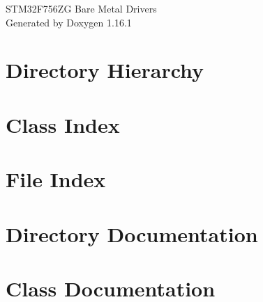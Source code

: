 \documentclass[twoside]{book}
\newcommand{\+}{\discretionary{\mbox{\scriptsize$\hookleftarrow$}}{}{}}
\newcommand{\clearemptydoublepage}{%
    \newpage{\pagestyle{empty}\cleardoublepage}%
  }
\begin{document}
  \raggedbottom
    \hypersetup{pageanchor=false,
                bookmarksnumbered=true,
                pdfencoding=unicode
               }
  \begin{titlepage}
  \vspace*{7cm}
  \begin{center}%
  {\Large STM32\+F756\+ZG Bare Metal Drivers}\\
  \vspace*{1cm}
  {\large Generated by Doxygen 1.16.1}\\
  \end{center}
  \end{titlepage}
  \clearemptydoublepage
  \tableofcontents
  \clearemptydoublepage
  \hypersetup{pageanchor=true}


\chapter{Directory Hierarchy}

\chapter{Class Index}

\chapter{File Index}

\chapter{Directory Documentation}









\chapter{Class Documentation}
















\end{document}
